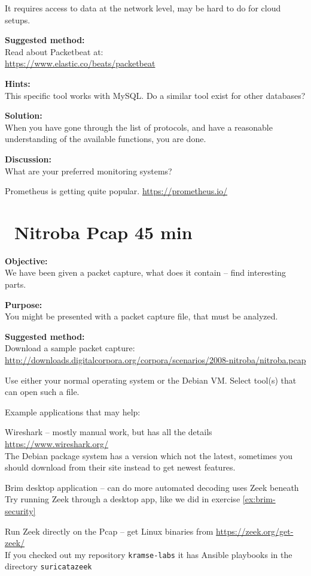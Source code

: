 \documentclass[a4paper,11pt,notitlepage]{report}
\begin{document}
It requires access to data at the network level, may be hard to do for cloud setups.

{\bf Suggested method:}\\
Read about Packetbeat at:\\
\url{https://www.elastic.co/beats/packetbeat}

{\bf Hints:}\\
This specific tool works with MySQL. Do a similar tool exist for other databases?


{\bf Solution:}\\
When you have gone through the list of protocols, and have a reasonable understanding of the available functions, you are done.

{\bf Discussion:}\\
What are your preferred monitoring systems?

Prometheus is getting quite popular.
\url{https://prometheus.io/}





\chapter{\faExclamationTriangle\ Nitroba Pcap 45 min}
\label{ex:nitroba-pcap}


{\bf Objective:}\\
We have been given a packet capture, what does it contain -- find interesting parts.

{\bf Purpose:}\\
You might be presented with a packet capture file, that must be analyzed.

{\bf Suggested method:}\\
Download a sample packet capture:\\
\url{http://downloads.digitalcorpora.org/corpora/scenarios/2008-nitroba/nitroba.pcap}

Use either your normal operating system or the Debian VM. Select tool(s) that can open such a file.


Example applications that may help:
\begin{list2}
\item Wireshark -- mostly manual work, but has all the details
\url{https://www.wireshark.org/}\\
The Debian package system has a version which not the latest, sometimes you should download from their site instead to get newest features.
\item Brim desktop application -- can do more automated decoding uses Zeek beneath\\
Try running Zeek through a desktop app, like we did in exercise \ref{ex:brim-security}
\item Run Zeek directly on the Pcap -- get Linux binaries from \url{https://zeek.org/get-zeek/}\\
If you checked out my repository \verb+kramse-labs+ it has Ansible playbooks in the directory \verb+suricatazeek+
\end{list2}
\end{document}
